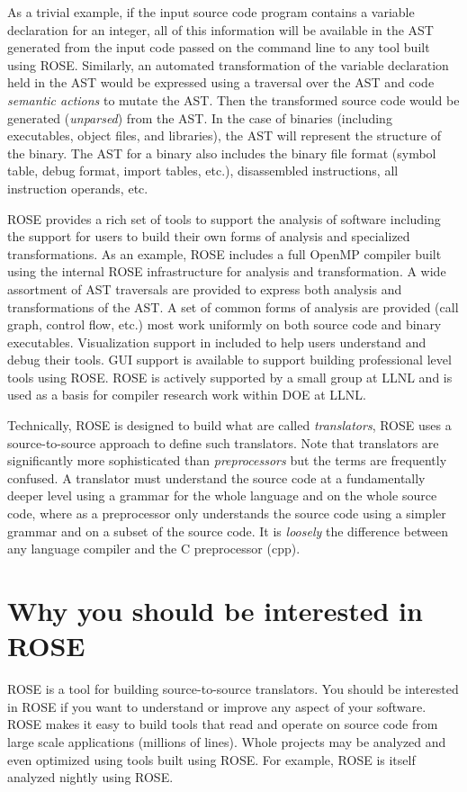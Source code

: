    As a trivial example, if the input source code program contains a variable declaration
for an integer, all of this information will be available in the AST generated from
the input code passed on the command line to any tool built using ROSE.
Similarly, an automated transformation of the variable declaration 
held in the AST would be expressed using a traversal over the AST and
code {\em semantic actions} to mutate the AST. Then the transformed source code would be 
generated ({\em unparsed}) from the AST.  In the case of binaries 
(including executables, object files, and libraries), the AST will 
represent the structure of the binary. The AST for a binary also includes the 
binary file format (symbol table, debug format, import tables, etc.), 
disassembled instructions, all instruction operands, etc.

   ROSE provides a rich set of tools to support the analysis of 
software including the support for users to build their own forms
of analysis and specialized transformations. As an example, ROSE includes
a full OpenMP compiler built using the internal ROSE infrastructure 
for analysis and transformation.
A wide assortment of AST traversals are provided
to express both analysis and transformations of the AST. A set of
common forms of analysis are provided (call graph, control flow, etc.)
most work uniformly on both source code and binary executables.
Visualization support in included to help users understand and debug
their tools.  GUI support is available to support building professional
level tools using ROSE. ROSE is actively supported by a small
group at LLNL and is used as a basis for compiler research work within 
DOE at LLNL.

   Technically, ROSE is designed to build what are called {\em translators}, 
ROSE uses a source-to-source approach to define such translators. Note that 
translators are significantly more sophisticated than {\em preprocessors} 
but the terms are frequently confused. A translator must understand the 
source code at a fundamentally deeper level using a grammar for the whole language
and on the whole source code, where as a preprocessor only understands the 
source code using a simpler grammar and on a subset of the source code. 
It is {\em loosely} the difference between any language compiler and the 
C preprocessor (cpp).

\section{Why you should be interested in ROSE}
ROSE is a tool for building source-to-source translators.
You should be interested in ROSE if you want to 
understand or improve any aspect of your software. ROSE
makes it easy to build tools that read and operate on source code
from large scale applications (millions of lines).  Whole projects
may be analyzed and even optimized using tools built using ROSE.
For example, ROSE is itself analyzed nightly using ROSE.

